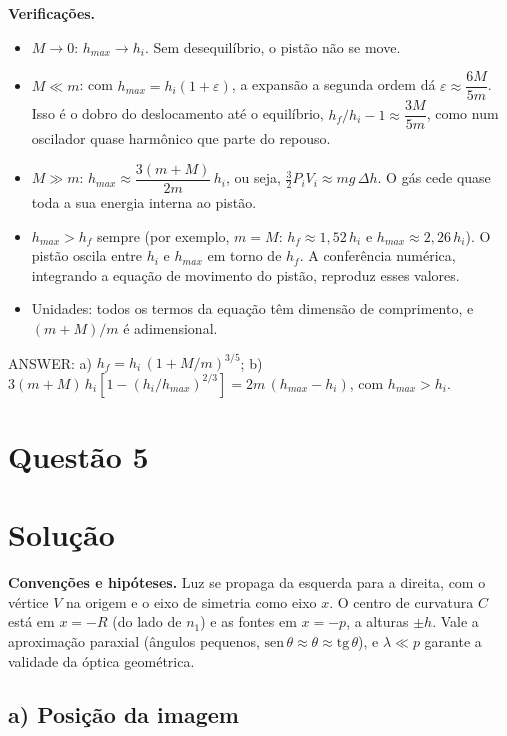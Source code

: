 \documentclass{article}%
\begin{document}
\textbf{Verificações.}
\begin{itemize}
\item $M\to0$: $h_{max}\to h_i$. Sem desequilíbrio, o pistão não se move.
\item $M\ll m$: com $h_{max}=h_i(1+\varepsilon)$, a expansão a segunda ordem dá $\varepsilon\approx \dfrac{6M}{5m}$. Isso é o dobro do deslocamento até o equilíbrio, $h_f/h_i-1\approx \dfrac{3M}{5m}$, como num oscilador quase harmônico que parte do repouso.
\item $M\gg m$: $h_{max}\approx \dfrac{3(m+M)}{2m}\,h_i$, ou seja, $\tfrac32P_iV_i\approx mg\,\Delta h$. O gás cede quase toda a sua energia interna ao pistão.
\item $h_{max}>h_f$ sempre (por exemplo, $m=M$: $h_f\approx1,52\,h_i$ e $h_{max}\approx2,26\,h_i$). O pistão oscila entre $h_i$ e $h_{max}$ em torno de $h_f$. A conferência numérica, integrando a equação de movimento do pistão, reproduz esses valores.
\item Unidades: todos os termos da equação têm dimensão de comprimento, e $(m+M)/m$ é adimensional.
\end{itemize}

\medskip
ANSWER: a) $h_f=h_i\,(1+M/m)^{3/5}$; \quad b) $3(m+M)\,h_i\left[1-(h_i/h_{max})^{2/3}\right]=2m\,(h_{max}-h_i)$, com $h_{max}>h_i$.%
\newpage%
\section*{Questão 5}

\section*{Solução}

\textbf{Convenções e hipóteses.} Luz se propaga da esquerda para a direita, com o vértice $V$ na origem e o eixo de simetria como eixo $x$. O centro de curvatura $C$ está em $x=-R$ (do lado de $n_1$) e as fontes em $x=-p$, a alturas $\pm h$. Vale a aproximação paraxial (ângulos pequenos, $\mathrm{sen}\,\theta\approx\theta\approx\mathrm{tg}\,\theta$), e $\lambda\ll p$ garante a validade da óptica geométrica.

\subsection*{a) Posição da imagem}
\end{document}
